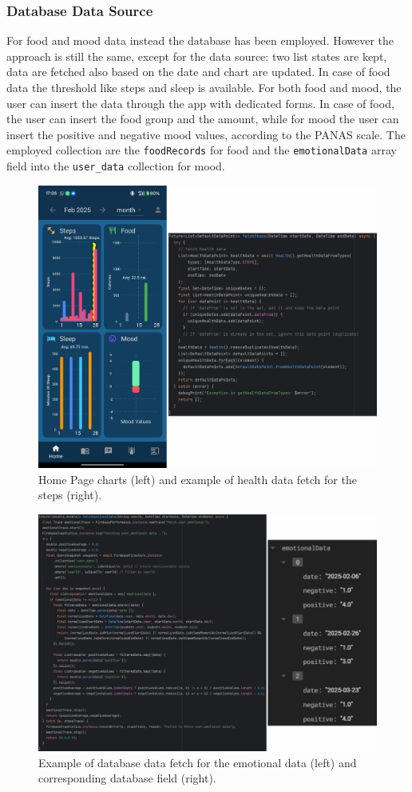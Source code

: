 \subsubsection{Database Data Source}
For food and mood data instead the database has been employed. However the approach is still the same, except for the data source: two list states are kept, data are fetched also based on the date and chart are updated. In case of food data the threshold like steps and sleep is available. For both food and mood, the user can insert the data through the app with dedicated forms. In case of food, the user can insert the food group and the amount, while for mood the user can insert the positive and negative mood values, according to the PANAS scale. The employed collection are the \texttt{foodRecords} for food and the \texttt{emotionalData} array field into the \texttt{user\_data} collection for mood.
\clearpage
\begin{figure}
    \centering
    \includegraphics[width=0.7\linewidth]{./images/homeFetch.jpg}
    \caption{Home Page charts (left) and example of health data fetch for the steps (right).}
\end{figure}

\begin{figure}
    \centering
    \includegraphics[width=0.7\linewidth]{./images/emotionalFetch.jpg}
    \caption{Example of database data fetch for the emotional data (left) and corresponding database field (right).}
\end{figure}

